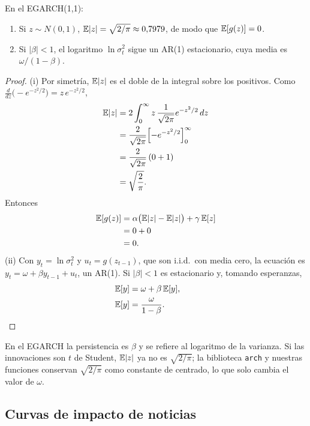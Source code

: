 \begin{proposicion}\label{prop:egarch}
En el EGARCH(1,1):
\begin{enumerate}[label=(\roman*)]
  \item Si $z\sim N(0,1)$, $\mathbb{E}|z|=\sqrt{2/\pi}\approx0{,}7979$, de modo que $\mathbb{E}[g(z)]=0$.
  \item Si $|\beta|<1$, el logaritmo $\ln\sigma_t^2$ sigue un AR(1) estacionario, cuya media es
        $\omega/(1-\beta)$.
\end{enumerate}
\end{proposicion}

\begin{proof}
(i) Por simetría, $\mathbb{E}|z|$ es el doble de la integral sobre los positivos. Como
$\frac{d}{dz}\bigl(-e^{-z^2/2}\bigr)=z\,e^{-z^2/2}$,
\begin{align*}
  \mathbb{E}|z| &= 2\int_0^\infty z\,\frac{1}{\sqrt{2\pi}}e^{-z^2/2}\,dz\\
        &= \frac{2}{\sqrt{2\pi}}\Bigl[-e^{-z^2/2}\Bigr]_0^\infty\\
        &= \frac{2}{\sqrt{2\pi}}\,(0+1)\\
        &= \sqrt{\frac{2}{\pi}} .
\end{align*}
Entonces
\begin{align*}
  \mathbb{E}[g(z)] &= \alpha\bigl(\mathbb{E}|z|-\mathbb{E}|z|\bigr)+\gamma\,\mathbb{E}[z]\\
           &= 0+0\\
           &= 0 .
\end{align*}
(ii) Con $y_t=\ln\sigma_t^2$ y $u_t=g(z_{t-1})$, que son i.i.d.\ con media cero, la ecuación es
$y_t=\omega+\beta y_{t-1}+u_t$, un AR(1). Si $|\beta|<1$ es estacionario y, tomando esperanzas,
\begin{align*}
  \mathbb{E}[y] &= \omega+\beta\,\mathbb{E}[y],\\
  \mathbb{E}[y] &= \frac{\omega}{1-\beta}. && \qedhere
\end{align*}
\end{proof}

En el EGARCH la persistencia es $\beta$ y se refiere al logaritmo de la varianza. Si las innovaciones son $t$
de Student, $\mathbb{E}|z|$ ya no es $\sqrt{2/\pi}$; la biblioteca \texttt{arch} y nuestras funciones conservan
$\sqrt{2/\pi}$ como constante de centrado, lo que solo cambia el valor de $\omega$.

\subsection{Curvas de impacto de noticias}

